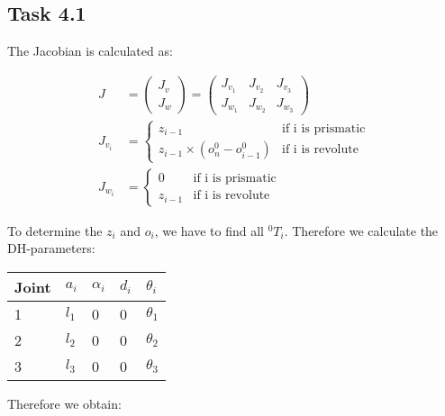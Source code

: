 \subsection*{Task 4.1}

The Jacobian is calculated as:

\begin{align*}
	J &= 
	\begin{pmatrix}
		J_v\\
		J_w
	\end{pmatrix}
	= 
	\begin{pmatrix}
		J_{v_1} & J_{v_2} & J_{v_3}\\
		J_{w_1}&J_{w_2}&J_{w_3}
	\end{pmatrix}\\
	J_{v_i} &=
	\begin{cases}
	 z_{i-1} & \text{if i is prismatic} \\
	 z_{i-1}\times (o_n^0-o_{i-1}^0) & \text{if i is revolute}
	\end{cases}\\
	J_{w_i} &=
	\begin{cases}
	0 & \text{if i is prismatic} \\
	z_{i-1} & \text{if i is revolute}
	\end{cases}
\end{align*}

To determine the $z_i$ and $o_i$, we have to find all $^0T_i$.
Therefore we calculate the DH-parameters:

\begin{center}
	\begin{tabular}{ | l | l | l | l | l |}
		\hline
		Joint & $a_{i}$ & $\alpha_{i}$ & $d_i$ & $\theta_i$ \\ \hline
		1 & $l_1$ & 0 & 0 & $\theta_1$ \\ \hline
		2 & $l_2$ & 0 & 0 & $\theta_2$ \\ \hline
		3 & $l_3$ & 0 & 0 & $\theta_3$ \\ \hline
	\end{tabular}
\end{center}

Therefore we obtain:

